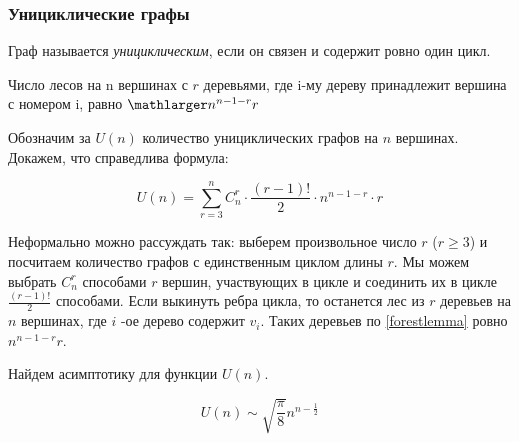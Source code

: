 \subsubsection{Унициклические графы}

\begin{Def}
	Граф называется \emph{унициклическим}, если он связен и содержит ровно один цикл.
\end{Def}

\begin{lemma} 
	Число лесов на n вершинах с $r$ деревьями, где i-му дереву принадлежит вершина с номером i, равно 
	$ \mathlarger n^{n-1-r}r$
\end{lemma}\label{forestlemma}



Обозначим за $U(n)$ количество унициклических графов на $n$ вершинах. Докажем, что справедлива формула:

$$
U(n)=\sum_{r=3}^{n} C_{n}^{r} \cdot \frac{(r-1)!}{2} \cdot n^{n-1-r} \cdot r
$$

Неформально можно рассуждать так: выберем произвольное число $r$ ($r \geqslant 3$) и посчитаем количество графов с единственным циклом длины $r$. Мы можем выбрать $C_{n}^{r}$ способами $r$ вершин, участвующих в цикле и соединить их в цикле $\frac{(r-1) !}{2}$ способами. Если выкинуть ребра цикла, то останется лес из $r$
деревьев на $n$ вершинах, где $i$ -ое дерево содержит $v_{i} .$ Таких деревьев по \ref{forestlemma} ровно $n^{n-1-r} r$.

Найдем асимптотику для функции $U(n)$.
\begin{theorem}
	$$U(n) \sim \sqrt{\frac{\pi}{8}} n^{n-\frac{1}{2}}$$
\end{theorem} \label{izvrat}

